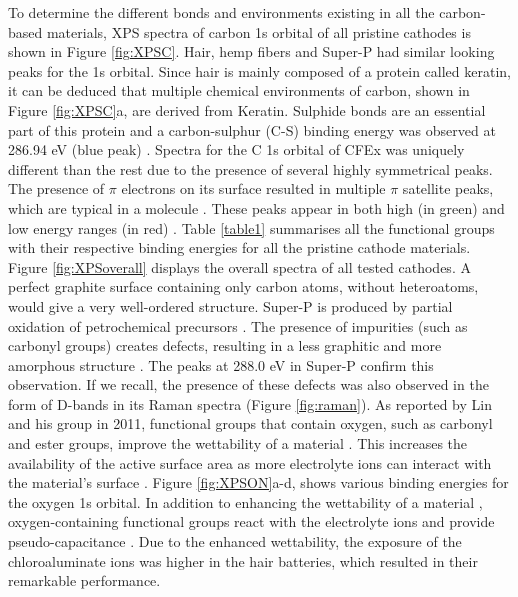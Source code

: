 \documentclass{article}
\begin{document}
To determine the different bonds and environments existing in all the carbon-based materials, XPS spectra of carbon 1s orbital of all pristine cathodes is shown in Figure \ref{fig:XPSC}. Hair, hemp fibers and Super-P had similar looking peaks for the 1s orbital. Since hair is mainly composed of a protein called keratin, it can be deduced that multiple chemical environments of carbon, shown in Figure \ref{fig:XPSC}a, are derived from Keratin. Sulphide bonds are an essential part of this protein and a carbon-sulphur (C-S) binding energy was observed at 286.94 eV (blue peak) \cite{qian_human_2013}. Spectra for the C 1s orbital of CFEx was uniquely different than the rest due to the presence of several highly symmetrical peaks. The presence of $\pi$ electrons on its surface resulted in  multiple $\pi$ satellite peaks, which are typical in a  molecule \cite{skryleva_xps_2016}. These peaks appear in both high (in green) and low energy ranges (in red) \cite{erbahar_spectromicroscopy_2016, poirier_carbon_1993}. Table \ref{table1} summarises all the functional groups with their respective binding energies for all the pristine cathode materials. Figure \ref{fig:XPSoverall} displays the overall spectra of all tested cathodes. A perfect graphite surface containing only carbon atoms, without heteroatoms, would give a very well-ordered structure. Super-P is produced by partial oxidation of petrochemical precursors \cite{gnanamuthu_electrochemical_2011}. The presence of impurities (such as carbonyl groups) creates defects, resulting in a less graphitic and more amorphous structure \cite{hao_carbonaceous_2013}. The peaks at 288.0 eV in Super-P confirm this observation. If we recall, the presence of these defects was also observed in the form of D-bands in its Raman spectra (Figure \ref{fig:raman}). As reported by Lin and his group in 2011, functional groups that contain oxygen, such as carbonyl and ester groups, improve the wettability of a material \cite{lin_superior_2011}. This increases the availability of the active surface area as more electrolyte ions can interact with the material's surface \cite{younesi_analysis_2015}. Figure \ref{fig:XPSON}a-d, shows various binding energies for the oxygen 1s orbital. In addition to enhancing the wettability of a material \cite{li_effect_2011, oh_oxygen_2014}, oxygen-containing functional groups react with the electrolyte ions and provide pseudo-capacitance \cite{bleda-martinez_role_2005}. Due to the enhanced wettability, the exposure of the chloroaluminate ions was higher in the hair batteries, which resulted in their remarkable performance.
\end{document}
